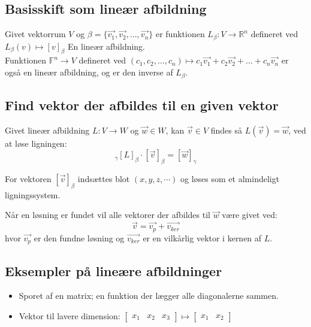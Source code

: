 \subsection{Basisskift som lineær afbildning}
Givet vektorrum $V$ og \( \beta = \{ \vec{v_1}, \vec{v_2}, \ldots, \vec{v_n} \} \)
er funktionen \( L_\beta : V \rightarrow \mathbb{R}^n \) defineret ved
\(
L_\beta(v) \mapsto [v]_\beta
\)
En lineær afbildning. \\

Funktionen \(\mathbb{F}^n \to V\) defineret ved
\( (c_1, c_2, \ldots, c_n) \mapsto c_1 \vec{v_1} + c_2 \vec{v_2} + \ldots + c_n \vec{v_n}\)
er også en lineær afbildning, og er den inverse af \( L_\beta \).


\subsection{Find vektor der afbildes til en given vektor}
Givet lineær afbildning \( L : V \rightarrow W \) og \( \vec{w} \in W \), kan \( \vec{v} \in V \) findes så \( L(\vec{v}) = \vec{w} \), ved at løse ligningen:
\[
_\gamma [L]_\beta \cdot [\vec{v}]_\beta = [\vec{w}]_\gamma
\]

For vektoren \([\vec{v}]_\beta\) indsættes blot $(x,y,z, \cdots)$ og løses som et almindeligt ligningssystem.

Når en løsning er fundet vil alle vektorer der afbildes til $\vec{w}$ være givet ved:
\[
    \vec{v} = \vec{v_p} + \vec{v_{ker}}
\]
hvor $\vec{v_p}$ er den fundne løsning og $\vec{v_{ker}}$ er en vilkårlig vektor i kernen af $L$. 


\subsection{Eksempler på lineære afbildninger}
\begin{itemize}
    \item Sporet af en matrix; en funktion der lægger alle diagonalerne sammen.
    
    \item Vektor til lavere dimension:
    \(
        \begin{bmatrix}
            x_1 & x_2 & x_3
        \end{bmatrix}
        \mapsto
        \begin{bmatrix}
            x_1 & x_2
        \end{bmatrix}
    \)
\end{itemize}

